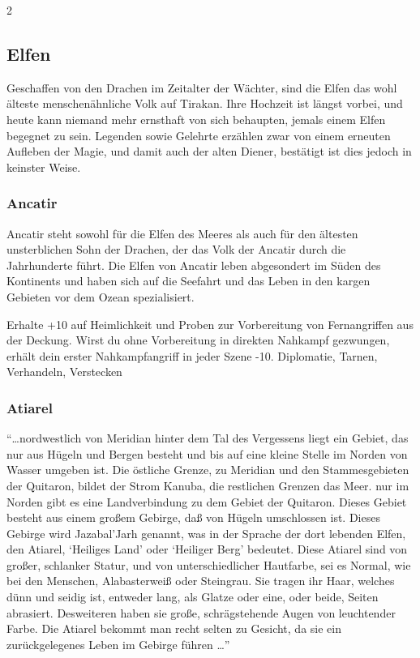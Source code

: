 {\begin{multicols*}{2}
        \subsection{Elfen}\label{subsec:abstammungen-elfen}

        Geschaffen von den Drachen im Zeitalter der Wächter, sind die Elfen das wohl älteste menschenähnliche Volk auf Tirakan. Ihre Hochzeit ist längst vorbei, und heute kann niemand mehr ernsthaft von sich behaupten, jemals einem Elfen begegnet zu sein. Legenden sowie Gelehrte erzählen zwar von einem erneuten Aufleben der Magie, und damit auch der alten Diener, bestätigt ist dies jedoch in keinster Weise.

        \subsubsection*{Ancatir}
        Ancatir steht sowohl für die Elfen des Meeres als auch für den ältesten unsterblichen Sohn der Drachen, der das Volk der Ancatir durch die Jahrhunderte führt. Die Elfen von Ancatir leben abgesondert im Süden des Kontinents und haben sich auf die Seefahrt und das Leben in den kargen Gebieten vor dem Ozean spezialisiert.

        \abstammungspielwertebox
        {Erhalte +10 auf Heimlichkeit und Proben zur Vorbereitung von Fernangriffen aus der Deckung.}
        {Wirst du ohne Vorbereitung in direkten Nahkampf gezwungen, erhält dein erster Nahkampfangriff in jeder Szene -10.}
        {Diplomatie, Tarnen, Verhandeln, Verstecken}

        \subsubsection*{Atiarel}
        ``\ldots nordwestlich von Meridian hinter dem Tal des Vergessens liegt ein Gebiet, das nur aus Hügeln und Bergen besteht und bis auf eine kleine Stelle im Norden von Wasser umgeben ist. Die östliche Grenze, zu Meridian und den Stammesgebieten der Quitaron, bildet der Strom Kanuba, die restlichen Grenzen das Meer. nur im Norden gibt es eine Landverbindung zu dem Gebiet der Quitaron. Dieses Gebiet besteht aus einem großem Gebirge, daß von Hügeln umschlossen ist. Dieses Gebirge wird Jazabal'Jarh genannt, was in der Sprache der dort lebenden Elfen, den Atiarel, `Heiliges Land' oder `Heiliger Berg' bedeutet. Diese Atiarel sind von großer, schlanker Statur, und von unterschiedlicher Hautfarbe, sei es Normal, wie bei den Menschen, Alabasterweiß oder Steingrau. Sie tragen ihr Haar, welches dünn und seidig ist, entweder lang, als Glatze oder eine, oder beide, Seiten abrasiert. Desweiteren haben sie große, schrägstehende Augen von leuchtender Farbe. Die Atiarel bekommt man recht selten zu Gesicht, da sie ein zurückgelegenes Leben im Gebirge führen \ldots'' ~


\end{multicols*}}
